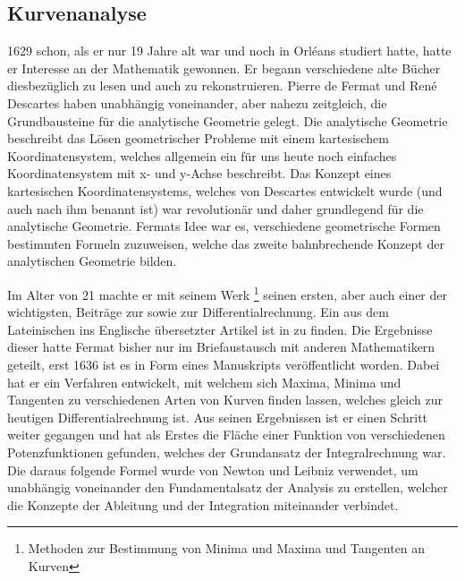 \subsection{Kurvenanalyse} \label{sec:kurvenanalyse}
1629 schon, als er nur 19 Jahre alt war und noch in Orléans studiert hatte, hatte er Interesse an der Mathematik gewonnen. Er begann verschiedene alte Bücher diesbezüglich zu lesen und auch zu rekonstruieren. Pierre de Fermat und René Descartes haben unabhängig voneinander, aber nahezu zeitgleich, die Grundbausteine für die \gls{analytische Geometrie} gelegt. Die analytische Geometrie beschreibt das Lösen geometrischer Probleme mit einem kartesischem Koordinatensystem, welches allgemein ein für uns heute noch einfaches Koordinatensystem mit x- und y-Achse beschreibt. Das Konzept eines kartesischen Koordinatensystems, welches von Descartes entwickelt wurde (und auch nach ihm benannt ist) war revolutionär und daher grundlegend für die analytische Geometrie. Fermats Idee war es, verschiedene geometrische Formen bestimmten  Formeln zuzuweisen, welche das zweite bahnbrechende Konzept der analytischen Geometrie bilden.

Im Alter von 21 machte er mit seinem Werk \textit{}\footnote{Methoden zur Bestimmung von Minima und Maxima und Tangenten an Kurven} seinen ersten, aber auch einer der wichtigsten, Beiträge zur  sowie zur \Gls{Differentialrechnung}. Ein aus dem Lateinischen ins Englische übersetzter Artikel ist in \cite{fermatMinMax} zu finden. Die Ergebnisse dieser hatte Fermat bisher nur im Briefaustausch mit anderen Mathematikern geteilt, erst 1636 ist es in Form eines Manuskripts veröffentlicht worden. Dabei hat er ein Verfahren entwickelt, mit welchem sich Maxima, Minima und Tangenten zu verschiedenen Arten von Kurven finden lassen, welches gleich zur heutigen Differentialrechnung ist. Aus seinen Ergebnissen ist er einen Schritt weiter gegangen und hat als Erstes die Fläche einer Funktion von verschiedenen Potenzfunktionen gefunden, welches der Grundansatz der \Gls{Integralrechnung} war. Die daraus folgende Formel wurde von Newton und Leibniz verwendet, um unabhängig voneinander den Fundamentalsatz der \Gls{Analysis} zu erstellen, welcher die Konzepte der Ableitung und der Integration miteinander verbindet.